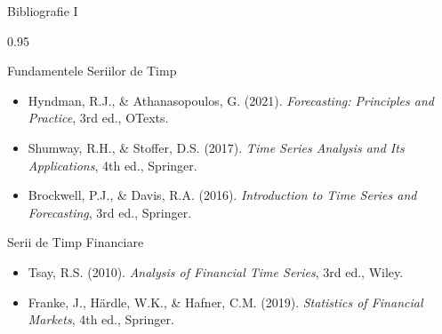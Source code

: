 \documentclass[9pt, aspectratio=169, t]{beamer}
\begin{document}
\begin{frame}{Bibliografie I}
    \begin{cminipage}{0.95\textwidth}
    \begin{block}{Fundamentele Seriilor de Timp}
        {\small
        \begin{itemize}\setlength{\itemsep}{0pt}
            \item Hyndman, R.J., \& Athanasopoulos, G. (2021). \textit{Forecasting: Principles and Practice}, 3rd ed., OTexts.
            \item Shumway, R.H., \& Stoffer, D.S. (2017). \textit{Time Series Analysis and Its Applications}, 4th ed., Springer.
            \item Brockwell, P.J., \& Davis, R.A. (2016). \textit{Introduction to Time Series and Forecasting}, 3rd ed., Springer.
        \end{itemize}
        }
    \end{block}

    \begin{exampleblock}{Serii de Timp Financiare}
        {\small
        \begin{itemize}\setlength{\itemsep}{0pt}
            \item Tsay, R.S. (2010). \textit{Analysis of Financial Time Series}, 3rd ed., Wiley.
            \item Franke, J., H\"ardle, W.K., \& Hafner, C.M. (2019). \textit{Statistics of Financial Markets}, 4th ed., Springer.
        \end{itemize}
        }
    \end{exampleblock}
    \end{cminipage}
\end{frame}
\end{document}
